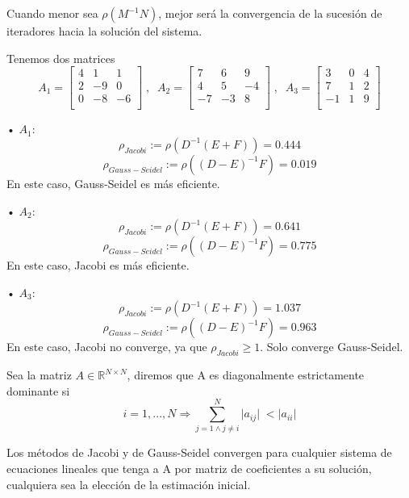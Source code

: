 \begin{nprop}
Cuando menor sea $\rho (M^{-1}N)$, mejor será la convergencia de la sucesión de iteradores hacia la solución del sistema.
\end{nprop}

\begin{ejemplo}
Tenemos dos matrices
\[
A_1 = \begin{bmatrix}
4 & 1 & 1 \\
2 & -9 & 0 \\
0 & -8 & -6 \\
\end{bmatrix}
\; , \; \;
A_2 = \begin{bmatrix}
7 & 6 & 9 \\
4 & 5 & -4 \\
-7 & -3 & 8 \\
\end{bmatrix}
\; , \; \;
A_3 = \begin{bmatrix}
3 & 0 & 4 \\
7 & 1 & 2 \\
-1 & 1 & 9 \\
\end{bmatrix}
\]
	\begin{nlist}
	\item[•] $A_1$:
	\[ \rho _{Jacobi} := \rho (D^{-1}(E+F)) = 0.444 \]
	\[ \rho _{Gauss-Seidel} := \rho ((D-E)^{-1}F) = 0.019 \]
	En este caso, Gauss-Seidel es más eficiente.
	\item[•] $A_2$:
	\[ \rho _{Jacobi} := \rho (D^{-1}(E+F)) = 0.641 \]
	\[ \rho _{Gauss-Seidel} := \rho ((D-E)^{-1}F) = 0.775 \]
	En este caso, Jacobi es más eficiente.
	\item[•] $A_3$:
	\[ \rho _{Jacobi} := \rho (D^{-1}(E+F)) = 1.037 \]
	\[ \rho _{Gauss-Seidel} := \rho ((D-E)^{-1}F) = 0.963 \]
	En este caso, Jacobi no converge, ya que $\rho _{Jacobi} \geq 1$. Solo converge Gauss-Seidel.
	\end{nlist}
\end{ejemplo}

\begin{ndef}
Sea la matriz $A \in \mathbb{R}^{N \times N}$, diremos que A es diagonalmente estrictamente dominante si
\[ i = 1,...,N \Rightarrow \sum_{j=1 \wedge j \neq i}^N \vert a_{ij} \vert \; < \vert a_{ii} \vert \]
\end{ndef}

Los métodos de Jacobi y de Gauss-Seidel convergen para cualquier sistema de ecuaciones lineales que tenga a A por matriz de coeficientes a su solución, cualquiera sea la elección de la estimación inicial.

